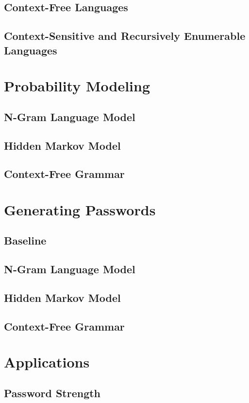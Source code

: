 \documentclass{amsart}
\theoremstyle{definition}
\theoremstyle{remark}
\numberwithin{equation}{section}
\begin{document}
\subsection{Context-Free Languages}
\subsection{Context-Sensitive and Recursively Enumerable Languages}

\section{Probability Modeling}
\subsection{N-Gram Language Model}
\subsection{Hidden Markov Model}
\subsection{Context-Free Grammar}

\section{Generating Passwords}
\subsection{Baseline}
\subsection{N-Gram Language Model}
\subsection{Hidden Markov Model}
\subsection{Context-Free Grammar}

\section{Applications}
\subsection{Password Strength}
\end{document}
